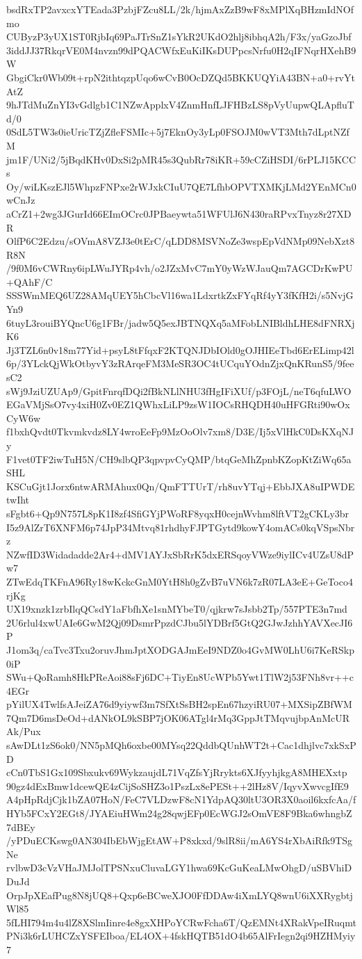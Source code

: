bsdRxTP2avxcxYTEada3PzbjFZcu8LL/2k/hjmAxZzB9wF8xMPlXqBHzmIdNOfmo
CUByzP3yUX1ST0RjbIq69PaJTrSnZ1sYkR2UKdO2hlj8ibhqA2h/F3x/yaGzoJbf
3iddJJ37RkqrVE0M4nvzn99dPQACWfxEuKiIKsDUPpcsNrfu0H2qIFNqrHXehB9W
GbgiCkr0Wb09t+rpN2ithtqzpUqo6wCvB0OcDZQd5BKKUQYiA43BN+a0+rvYtAtZ
9hJTdMuZnYI3vGdlgb1C1NZwApplxV4ZnmHnfLJFHBzLS8pVyUupwQLApfluTd/0
0SdL5TW3s0ieUricTZjZfleFSMIc+5j7EknOy3yLp0FSOJM0wVT3Mth7dLptNZfM
jm1F/UNi2/5jBqdKHv0DxSi2pMR45s3QubRr78iKR+59cCZiHSDI/6rPLJ15KCCs
Oy/wiLKszEJl5WhpzFNPxe2rWJxkCIuU7QE7LfhbOPVTXMKjLMd2YEnMCn0wCnJz
aCrZ1+2wg3JGurId66EImOCrc0JPBaeywta51WFUlJ6N430raRPvxTnyz8r27XDR
OlfP6C2Edzu/sOVmA8VZJ3e0tErC/qLDD8MSVNoZe3wspEpVdNMp09NebXzt8R8N
/9f0M6vCWRny6ipLWuJYRp4vh/o2JZxMvC7mY0yWzWJauQm7AGCDrKwPU+QAhF/C
SSSWmMEQ6UZ28AMqUEY5hCbcVl16wa1LdxrtkZxFYqRf4yY3fKfH2i/s5NvjGYn9
6tuyL3rouiBYQncU6g1FBr/jadw5Q5exJBTNQXq5aMFobLNIBldhLHE8dFNRXjK6
Jj3TZL6n0v18m77Yid+psyL8tFfqxF2KTQNJDbIOld0gOJHIEeTbd6ErELimp42l
6p/3YLckQjWkOtbyvY3zRArqeFM3MeSR3OC4tUCquYOdnZjxQnKRunS5/9feesC2
sWj9JziUZUAp9/GpitFnrqfDQi2fBkNLlNHU3fHgIFiXUf/p3FOjL/neT6qfuLWO
EGaVMjSsO7vy4xiH0Zv0EZ1QWhxLiLP9zsW1IOCsRHQDH40uHFGRti90wOxCyW6w
f1bxhQvdt0Tkvmkvdz8LY4wroEeFp9MzOoOlv7xm8/D3E/Ij5xVlHkC0DsKXqNJy
F1vet0TF2iwTuH5N/CH9slbQP3qpvpvCyQMP/btqGeMhZpnbKZopKtZiWq65aSHL
KSCuGjt1Jorx6ntwARMAhux0Qn/QmFTTUrT/rh8uvYTqj+EbbJXA8uIPWDEtwIht
sFgbt6+Qp9N757L8pK1I8zf4SfiGYjPWoRF8yqxH0cejnWvhm8lftVT2gCKLy3br
I5z9AlZrT6XNFM6p74JpP34Mtvq81rhdhyFJPTGytd9kowY4omACs0kqVSpsNbrz
NZwfID3Widadadde2Ar4+dMV1AYJxSbRrK5dxERSqoyVWze9iylICv4UZsU8dPw7
ZTwEdqTKFnA96Ry18wKckcGnM0YtH8h0gZvB7uVN6k7zR07LA3eE+GeToco4rjKg
UX19xnzk1zrbIlqQCsdY1aFbfhXe1snMYbeT0/qjkrw7sJsbb2Tp/557PTE3n7md
2U6rlul4xwUAIe6GwM2Qj09DsmrPpzdCJbu5lYDBrf5GtQ2GJwJzhhYAVXecJI6P
J1om3q/caTvc3Txu2oruvJhmJptXODGAJmEeI9NDZ0o4GvMW0LhU6i7KeRSkp0iP
SWu+QoRamh8HkPReAoi88sFj6DC+TiyEn8UcWPb5Ywt1TlW2j53FNh8vr++c4EGr
pYilUX4TwlfsAJeiZA76d9yiywf3m7SfXtSsBH2spEn67hzyiRU07+MXSipZBfWM
7Qm7D6msDeOd+dANkOL9kSBP7jOK06ATgl4rMq3GppJtTMqvujbpAnMcURAk/Pux
sAwDLt1zS6ok0/NN5pMQh6oxbe00MYsq22QddbQUnhWT2t+Cac1dhjlvc7xkSxPD
cCn0TbS1Gx109Sbxukv69WykzaujdL71VqZfsYjRrykts6XJfyyhjkgA8MHEXxtp
90gz4dExBmw1dcewQE4zCijSoSHZ3o1PszLx8ePESt++2lHz8V/IqyvXwvcgIfE9
A4pHpRdjCjk1bZA07HoN/FeC7VLDzwF8cN1YdpAQ30ltU3OR3X0aoil6kxfcAa/f
HYb5FCxY2EGt8/JYAEiuHWm24g28qwjEFp0EcWGJ2sOmVE8F9Bka6whngbZ7dBEy
/yPDuECKswg0AN304IbEbWjgEtAW+P8xkxd/9slR8ii/mA6YS4rXbAiRfk9TSgNe
rvlbwD3cVzVHaJMJolTPSNxuCluvaLGY1hwa69KcGuKeaLMwOhgD/uSBVhiDDuJd
OrpJpXEafPug8N8jUQ8+Qxp6eBCweXJO0FfDDAw4iXmLYQ8wnU6iXXRygbtjWl85
5fLHI794m4u4lZ8XSlmIinre4e8gxXHPoYCRwFcha6T/QzEMNt4XRakVpeIRuqmt
PNi3k6rLUHCZxYSFEIboa/EL4OX+4fskHQTB51dO4b65AlFrIegn2qi9HZHMyiy7
